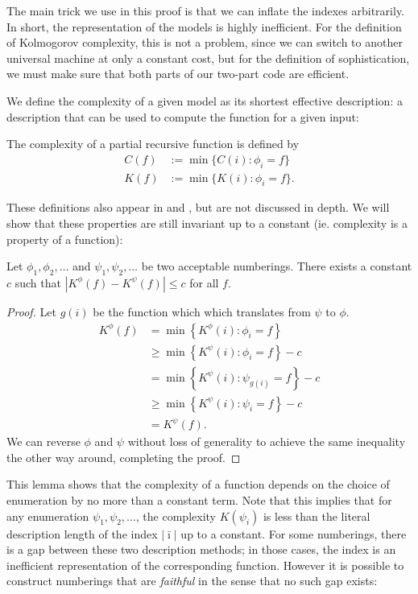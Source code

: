 \documentclass{style/llncs}
\begin{document}
The main trick we use in this proof is that we can inflate the indexes arbitrarily. In short, the representation of the models is highly inefficient. For the definition of Kolmogorov complexity, this is not a problem, since we can switch to another universal machine at only a constant cost, but for the definition of sophistication, we must make sure that both parts of our two-part code are efficient.

We define the complexity of a given model as its shortest effective description: a description that can be used to compute the function for a given input: 

\begin{definition}
  The complexity of a partial recursive function is defined by
  \begin{align*}
    C(f) &:= \min\{C(i):\phi_i=f\}\\
    K(f) &:= \min\{K(i):\phi_i=f\}.
  \end{align*} \label{definition:model-complexity}
\end{definition}
These definitions also appear in \cite{} and \cite{}, but are not discussed in depth. We will show that these properties are still invariant up to a constant (ie. complexity is a property of a function):
\begin{lemma}[Invariance]
Let $\phi_1, \phi_2, \ldots$ and $\psi_1, \psi_2,\ldots$ be two acceptable numberings. There exists a constant $c$ such that $\left| K^\phi(f) - K^\psi(f)\right | \leq c$ for all $f$. \label{lemma:invariance}
\end{lemma}
\begin{proof}
Let $g(i)$ be the function which which translates from $\psi$ to $\phi$.
\begin{align*}
K^\phi(f) &= \min\left\{ K^\phi(i) : \phi_i= f\right\} \\
&\geq \min\left\{ K^\psi(i) : \phi_i= f\right\} - c\\
&= \min\left\{ K^\psi(i) : \psi_{g(i)}= f\right\} - c\\
&\geq \min\left\{ K^\psi(i) : \psi_i= f\right\} - c\\
&= K^\psi(f).
\end{align*}
We can reverse $\phi$ and $\psi$ without loss of generality to achieve the same inequality the other way around, completing the proof.
\end{proof}

This lemma shows that the complexity of a function depends on the choice of
enumeration by no more than a constant term. Note that this implies
that for any enumeration $\psi_1,\psi_2,\ldots$, the complexity $K(\psi_i)$
is less than the literal description length of the index
$|\bar\imath|$ up to a constant. For some numberings, there is a gap
between these two description methods; in those cases, the index is an
inefficient representation of the corresponding function. However it
is possible to construct numberings that are \emph{faithful} in the
sense that no such gap exists:
\end{document}

